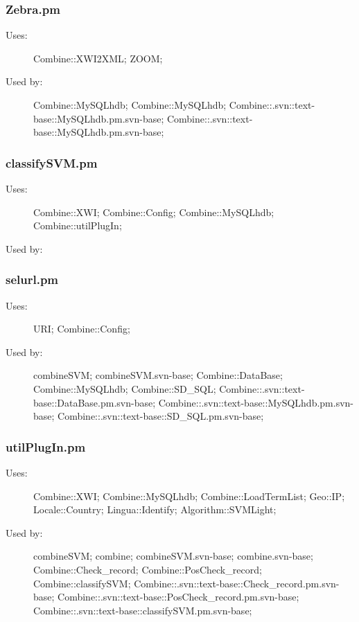 \subsubsection{Zebra.pm}
\begin{description}
\item[Uses:] Combine::XWI2XML; ZOOM; 

\item[Used by:] Combine::MySQLhdb; Combine::MySQLhdb; Combine::.svn::text-base::MySQLhdb.pm.svn-base; Combine::.svn::text-base::MySQLhdb.pm.svn-base; 

\end{description}
\subsubsection{classifySVM.pm}
\begin{description}
\item[Uses:] Combine::XWI; Combine::Config; Combine::MySQLhdb; Combine::utilPlugIn; 

\item[Used by:] 

\end{description}
\subsubsection{selurl.pm}
\begin{description}
\item[Uses:] URI; Combine::Config; 

\item[Used by:] combineSVM; combineSVM.svn-base; Combine::DataBase; Combine::MySQLhdb; Combine::SD\_SQL; Combine::.svn::text-base::DataBase.pm.svn-base; Combine::.svn::text-base::MySQLhdb.pm.svn-base; Combine::.svn::text-base::SD\_SQL.pm.svn-base; 

\end{description}
\subsubsection{utilPlugIn.pm}
\begin{description}
\item[Uses:] Combine::XWI; Combine::MySQLhdb; Combine::LoadTermList; Geo::IP; Locale::Country; Lingua::Identify; Algorithm::SVMLight; 

\item[Used by:] combineSVM; combine; combineSVM.svn-base; combine.svn-base; Combine::Check\_record; Combine::PosCheck\_record; Combine::classifySVM; Combine::.svn::text-base::Check\_record.pm.svn-base; Combine::.svn::text-base::PosCheck\_record.pm.svn-base; Combine::.svn::text-base::classifySVM.pm.svn-base; 

\end{description}
